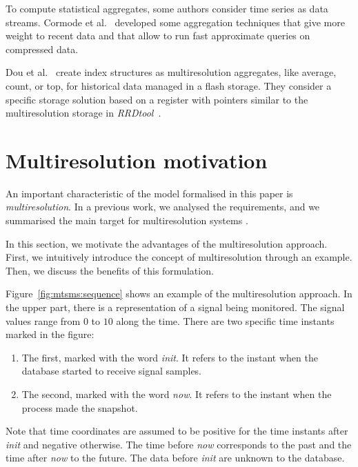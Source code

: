 To compute statistical aggregates, some authors consider time series
as data streams. Cormode et al.~\cite{cormode08:pods} developed some
aggregation techniques that give more weight to recent data and that
allow to run fast approximate queries on compressed data.

Dou et al.~\cite{dou14:historic_queries_flash_storage} create index
structures as multiresolution aggregates, like average, count, or top,
for historical data managed in a flash storage. They consider a specific
storage solution based on a register with pointers similar to the
multiresolution storage in \emph{RRDtool}~\cite{lisa98:oetiker}.


\section{Multiresolution motivation}
\label{sec:features}

An important characteristic of the model formalised in this paper is
\emph{multiresolution}. In a previous work, we analysed the
requirements, and we summarised the main target for multiresolution
systems \cite{llusa13:aiked}.

In this section, we motivate the advantages of the multiresolution
approach. First, we intuitively introduce the concept of
multiresolution through an example. Then, we discuss the benefits of
this formulation.

Figure~\ref{fig:mtsms:sequence} shows an example of the
multiresolution approach. In the upper part, there is a representation
of a signal being monitored. The signal values range from $0$ to $10$
along the time. There are two specific time instants marked in the
figure:

\begin{enumerate}

\item The first, marked with the word \emph{init}. It refers to the
  instant when the database started to receive signal samples.

\item The second, marked with the word \emph{now}. It refers to the
  instant when the process made the snapshot.

\end{enumerate}

Note that time coordinates are assumed to be positive for the time
instants after \emph{init} and negative otherwise. The time before
\emph{now} corresponds to the past and the time after \emph{now} to
the future.  The data before \emph{init} are unknown to the database.


